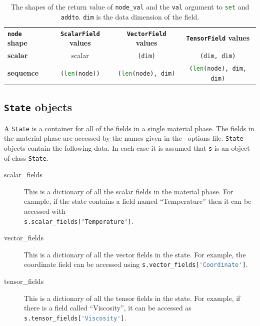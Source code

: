 \begin{table}
\centering

\begin{tabular}{lccc}
  \textbf{\lstinline[language=Python]+node+ shape}
  &\textbf{\lstinline[language=Python]+ScalarField+ values} &
  \textbf{\lstinline[language=Python]+VectorField+ values} &
  \textbf{\lstinline[language=Python]+TensorField+ values}\\
  \textbf{scalar} &
scalar& \lstinline[language=Python]+(dim)+ &\lstinline[language=Python]+(dim, dim)+ \\
  \textbf{sequence} &
\lstinline[language=Python]+(len(node))+&
\lstinline[language=Python]+(len(node), dim)+&
\lstinline[language=Python]+(len(node), dim, dim)+\\
\end{tabular}

\caption{The shapes of the return value of \lstinline[language=Python]+node_val+ and the
\lstinline[language=Python]+val+ argument to
\lstinline[language=Python]+set+ and
\lstinline[language=Python]+addto+. \lstinline[language=Python]+dim+ is the
data dimension of the field.
}
\end{table}

\subsection{\lstinline[language=Python]+State+ objects}

A \lstinline[language=Python]+State+ is a container for all of the fields in
a single material phase. The fields in the material phase are accessed by
the names given in the \fluidity\ options file.
\lstinline[language=Python]+State+ objects contain the following data. In
each case it is assumed that \lstinline[language=Python]+s+ is an object of
class \lstinline[language=Python]+State+.

\begin{description}
\item[scalar\_fields] This is a dictionary of all the scalar fields in the
  material phase. For example, if the state contains a field named
  ``Temperature'' then it can be accessed with\\
  \lstinline+s.scalar_fields['Temperature']+.
\item[vector\_fields] This is a dictionary of all the vector fields in the
  state. For example, the coordinate field can be accessed using
  \lstinline[language=Python]+s.vector_fields['Coordinate']+.
\item[tensor\_fields] This is a dictionary of all the tensor fields in the
  state. For example, if there is a field called ``Viscosity'', it can be
  accessed as \lstinline[language=Python]+s.tensor_fields['Viscosity']+.
\end{description}

